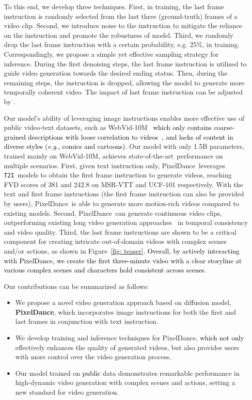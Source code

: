 \documentclass[10pt,twocolumn,letterpaper]{article}
\newcommand{\tcb}{\textcolor{black}}
\newcommand{\tcr}{\textcolor{black}}
\newcommand{\tcg}{\textcolor{black}}
\newcommand{\sota}{{state-of-the-art}}
\newcommand{\ti}{{\texttt{T2I}}}
\newcommand{\ours}{{PixelDance}}
\begin{document}
To this end, we develop three techniques. First, in training, the last frame instruction is randomly selected from the last three (ground-truth) frames of a video clip. Second, we introduce noise to the instruction to mitigate the reliance on the instruction and promote the robustness of model. Third, we randomly drop the last frame instruction with a certain probability, e.g. 25\%, in training. Correspondingly, we propose a simple yet effective sampling strategy for inference. During the first  denoising steps, the last frame instruction is utilized to guide video generation towards the desired ending status. Then, during the remaining steps, the instruction is dropped, allowing the model to generate more temporally coherent video. The impact of last frame instruction can be adjusted by .  


Our model's ability of leveraging image instructions enables more effective use of public video-text datasets, such as WebVid-10M~\cite{bain2021WEBVID} \tcb{which only contains coarse-grained descriptions with loose correlation to videos~\cite{singer2022make}, and lacks of content in diverse styles (\textit{e.g.}, comics and cartoons).} 
Our model with only 1.5B parameters, trained mainly on WebVid-10M, achieves \sota~performance on multiple scenarios. First, given text instruction only, \ours~leverages \ti~models to obtain the first frame instruction to generate videos, reaching FVD scores of 381 and 242.8 on MSR-VTT \cite{xu2016msr-vtt} and UCF-101 \cite{soomro2012UCF} respectively. With the text and first frame instructions (the first frame instruction can also be provided by users), \ours~is able to generate more motion-rich videos compared to existing models. Second, \ours~can generate continuous video clips, outperforming existing long video generation approaches~\cite{he2022LVDM,ge2022TATS} in temporal consistency and video quality. Third, the last frame instructions are shown to be a critical component for creating intricate out-of-domain videos with complex scenes and/or actions, as shown in Figure~\ref{fig: teaser}. 
\tcr{Overall, by actively interacting with \ours, we create the first three-minute video with a clear storyline at various complex scenes and characters hold consistent across scenes. }


Our contributions can be summarized as follows:
\begin{itemize}
\item We propose a novel video generation approach based on diffusion model, \textbf{\ours}, which incorporates image instructions for both the first and last frames in conjunction with text instruction.


\item We develop training and inference techniques for \ours, \tcg{which not only} effectively enhances the quality of generated videos, but also provides users with more control over the video generation process.


\item Our model trained on \tcg{public} data demonstrates remarkable performance in high-dynamic video generation with complex scenes and actions, setting a new standard for video generation.
\end{itemize}
\end{document}
